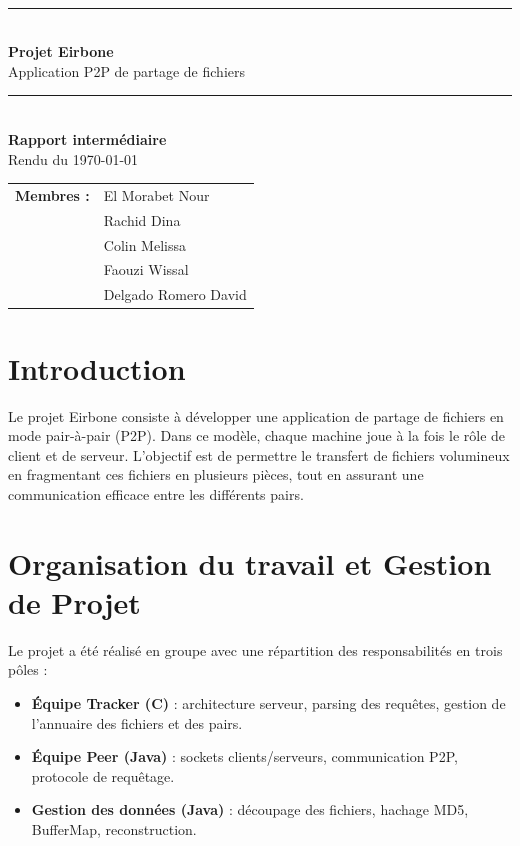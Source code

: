 \documentclass[11pt, a4paper]{article}
\begin{document}
\begin{titlepage}
  \centering
  \vspace*{2cm}

  {\Large \textsc{}}\\[0.4cm]

  \rule{\linewidth}{0.5pt}\\[0.4cm]
  {\huge \bfseries Projet Eirbone }\\[0.3cm]
  {\LARGE Application P2P de partage de fichiers}\\[0.2cm]
  \rule{\linewidth}{0.5pt}\\[1.5cm]

  {\large \textbf{Rapport intermédiaire}}\\[0.5cm]
  {\normalsize Rendu du \today}\\[2cm]

  \begin{tabular}{ll}
    \textbf{Membres :} & El Morabet Nour \\
                       & Rachid Dina \\
                       & Colin Melissa \\
                       & Faouzi Wissal\\
                       & Delgado Romero David\\
  \end{tabular}

  \vfill
\end{titlepage}

\tableofcontents
\newpage

\section{Introduction}
Le projet Eirbone consiste à développer une application de partage de fichiers en mode pair-à-pair (P2P). 
Dans ce modèle, chaque machine joue à la fois le rôle de client et de serveur. L'objectif est de permettre le transfert de fichiers volumineux en fragmentant ces fichiers en plusieurs pièces, tout en assurant une communication efficace entre les différents pairs.

\section{Organisation du travail et Gestion de Projet}
Le projet a été réalisé en groupe avec une répartition des responsabilités en trois pôles :
\begin{itemize}
    \item \textbf{Équipe Tracker (C)} : architecture serveur, parsing des requêtes, gestion de l'annuaire des fichiers et des pairs.
    \item \textbf{Équipe Peer (Java)} : sockets clients/serveurs, communication P2P, protocole de requêtage.
    \item \textbf{Gestion des données (Java)} : découpage des fichiers, hachage MD5, BufferMap, reconstruction.
\end{itemize}
\end{document}
